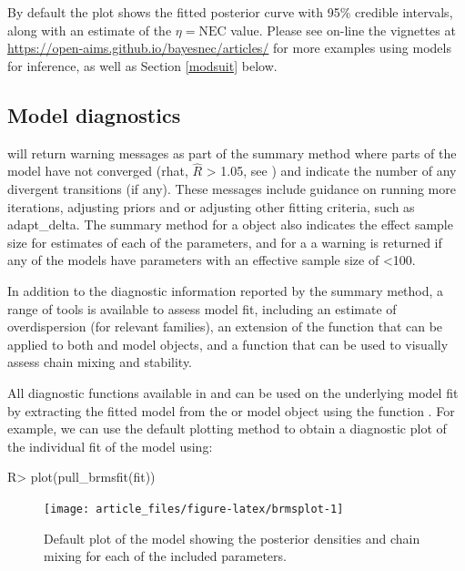 \documentclass[
  shortnames]{jss}
\begin{document}
By default the plot shows the fitted posterior curve with 95\% credible intervals, along with an estimate of the \(\eta = \text{NEC}\) value. Please see on-line the vignettes at \url{https://open-aims.github.io/bayesnec/articles/} for more examples using  models for inference, as well as Section \ref{modsuit} below.

\subsection[Model diagnostics]{Model diagnostics}\label{moddiag}

 will return warning messages as part of the summary method where parts of the model have not converged (rhat, \(\widehat{R}\) \textgreater{} 1.05, see \citet{vehtari2021rank}) and indicate the number of any divergent transitions (if any). These messages include guidance on running more iterations, adjusting priors and or adjusting other fitting criteria, such as adapt\_delta. The summary method for a  object also indicates the effect sample size for estimates of each of the parameters, and for a  a warning is returned if any of the models have parameters with an effective sample size of \textless100.

In addition to the diagnostic information reported by the summary method, a range of tools is available to assess model fit, including an estimate of overdispersion (for relevant families), an extension of the   function that can be applied to both  and  model objects, and a function  that can be used to visually assess chain mixing and stability.

All diagnostic functions available in  and  can be used on the underlying  model fit by extracting the fitted  model from the  or  model object using the function . For example, we can use the default  plotting method to obtain a diagnostic plot of the individual fit of the  model using:

\begin{CodeChunk}
\begin{CodeInput}
R> plot(pull_brmsfit(fit))
\end{CodeInput}
\begin{figure}[!ht]

{\centering \texttt{[image: article\_files/figure-latex/brmsplot-1]} 

}

\caption[Default  plot of the  model showing the posterior densities and chain mixing for each of the included parameters]{Default  plot of the  model showing the posterior densities and chain mixing for each of the included parameters.}\label{fig:brmsplot}
\end{figure}
\end{CodeChunk}
\end{document}
